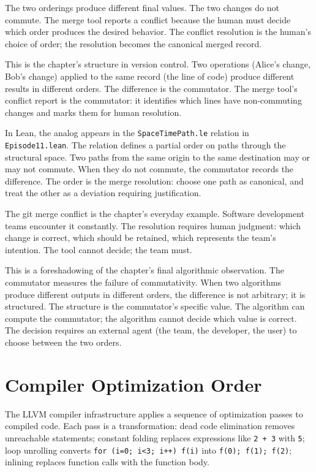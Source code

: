The two orderings produce different final values. The two changes
do not commute. The merge tool reports a conflict because the
human must decide which order produces the desired behavior. The
conflict resolution is the human's choice of order; the resolution
becomes the canonical merged record.

This is the chapter's structure in version control. Two operations
(Alice's change, Bob's change) applied to the same record (the
line of code) produce different results in different orders. The
difference is the commutator. The merge tool's conflict report is
the commutator: it identifies which lines have non-commuting
changes and marks them for human resolution.

In Lean, the analog appears in the \texttt{SpaceTimePath.le}
relation in \texttt{Episode11.lean}. The relation defines a partial
order on paths through the structural space. Two paths from the
same origin to the same destination may or may not commute. When
they do not commute, the commutator records the difference. The
order is the merge resolution: choose one path as canonical, and
treat the other as a deviation requiring justification.

The git merge conflict is the chapter's everyday example. Software
development teams encounter it constantly. The resolution requires
human judgment: which change is correct, which should be retained,
which represents the team's intention. The tool cannot decide; the
team must.

This is a foreshadowing of the chapter's final algorithmic
observation. The commutator measures the failure of commutativity.
When two algorithms produce different outputs in different orders,
the difference is not arbitrary; it is structured. The structure
is the commutator's specific value. The algorithm can compute the
commutator; the algorithm cannot decide which value is correct.
The decision requires an external agent (the team, the developer,
the user) to choose between the two orders.

\section{Compiler Optimization Order}
\label{se:compiler-optimization-order}

The LLVM compiler infrastructure applies a sequence of optimization
passes to compiled code. Each pass is a transformation: dead code
elimination removes unreachable statements; constant folding
replaces expressions like \texttt{2 + 3} with \texttt{5}; loop
unrolling converts \texttt{for (i=0; i<3; i++) f(i)} into
\texttt{f(0); f(1); f(2)}; inlining replaces function calls with
the function body.

